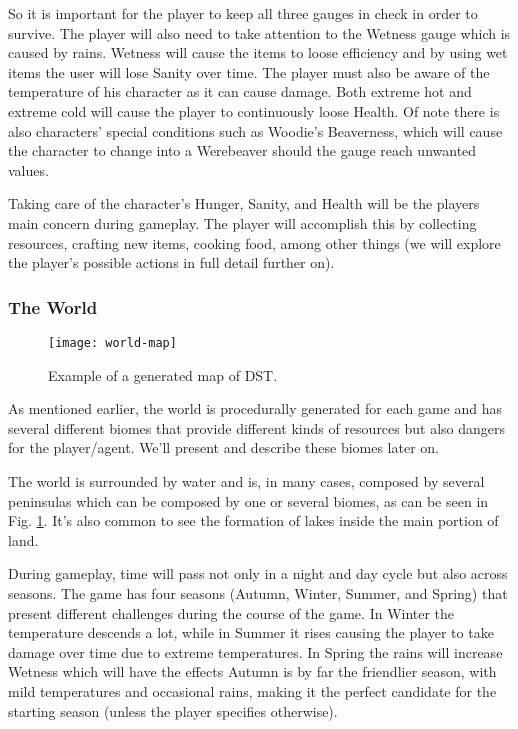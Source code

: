 So it is important for the player to keep all three gauges in check in order to survive.
The player will also need to take attention to the Wetness gauge which is caused by rains. Wetness will cause the items to loose efficiency and by using wet items the user will lose Sanity over time.
The player must also be aware of the temperature of his character as it can cause damage. Both extreme hot and extreme cold will cause the player to continuously loose Health.
Of note there is also characters' special conditions such as Woodie's Beaverness, which will cause the character to change into a Werebeaver should the gauge reach unwanted values.

Taking care of the character's Hunger, Sanity, and Health will be the players main concern during gameplay.
The player will accomplish this by collecting resources, crafting new items, cooking food, among other things (we will explore the player's possible actions in full detail further on).

\subsubsection{The World}

\begin{figure}
  \centering
    \texttt{[image: world-map]}
  \caption{Example of a generated map of \ac{DST}.}
  \label{fig:world-map}
\end{figure}
As mentioned earlier, the world is procedurally generated for each game and has several different biomes that provide different kinds of resources but also dangers for the player/agent. 
We'll present and describe these biomes later on.

The world is surrounded by water and is, in many cases, composed by several peninsulas which can be composed by one or several biomes, as can be seen in Fig. \ref{fig:world-map}.
It's also common to see the formation of lakes inside the main portion of land.

During gameplay, time will pass not only in a night and day cycle but also across seasons.
The game has four seasons (Autumn, Winter, Summer, and Spring) that present different challenges during the course of the game.
In Winter the temperature descends a lot, while in Summer it rises causing the player to take damage over time due to extreme temperatures.
In Spring the rains will increase Wetness which will have the effects 
Autumn is by far the friendlier season, with mild temperatures and occasional rains, making it the perfect candidate for the starting season (unless the player specifies otherwise).

